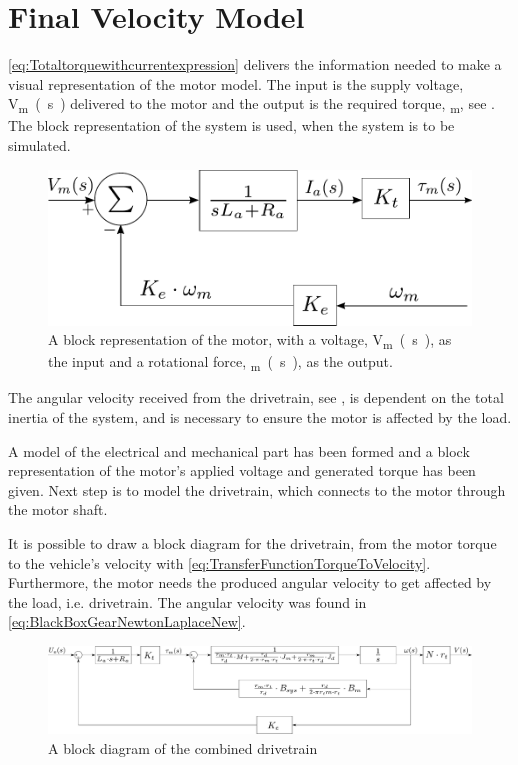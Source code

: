 \section{Final Velocity Model}
\eqref{eq:Totaltorquewithcurrentexpression} delivers the information needed to make a visual representation of the motor model. The input is the supply voltage, \si{V_m(s)} delivered to the motor and the output is the required torque, \si{\tau_m}, see . The block representation of the system is used, when the system is to be simulated.

\begin{figure}[H]
	\centering
	\includegraphics[scale=0.9]{figures/motormodelBlock.pdf}
	\caption{A block representation of the motor, with a voltage, \si{V_m(s)}, as the input and a rotational force, \si{\tau_m(s)}, as the output.}
	\label{fig:motormodelBlock}
\end{figure}

The angular velocity received from the drivetrain, see , is dependent on the total inertia of the system, and is necessary to ensure the motor is affected by the load.

A model of the electrical and mechanical part has been formed and a block representation of the motor's applied voltage and generated torque has been given. Next step is to model the drivetrain, which connects to the motor through the motor shaft.








It is possible to draw a block diagram for the drivetrain, from the motor torque to the vehicle's velocity with \eqref{eq:TransferFunctionTorqueToVelocity}. Furthermore, the motor needs the produced angular velocity to get affected by the load, i.e. drivetrain. The angular velocity was found in \eqref{eq:BlackBoxGearNewtonLaplaceNew}.

\begin{figure}[H]
	\centering
	\includegraphics[scale=.28]{figures/totalVelocityModelDiagramComplicated.pdf}
	\caption{A block diagram of the combined drivetrain}
	\label{fig:BlockDiagramDrivetrain}
\end{figure}

